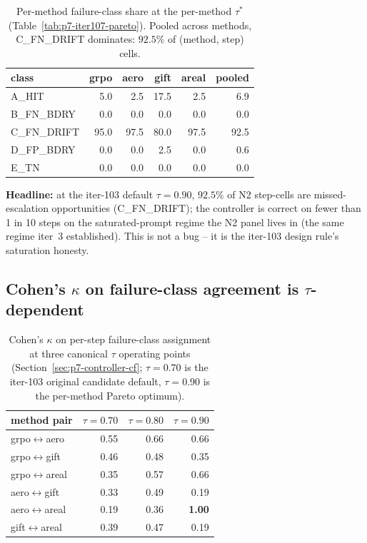 \begin{table}[t]
\centering\small
\caption{Per-method failure-class share at the per-method $\tau^*$ (Table~\ref{tab:p7-iter107-pareto}).  Pooled across methods,
C\_FN\_DRIFT dominates: $92.5\%$ of (method, step) cells.}
\label{tab:p7-iter107-failshare}
\vspace{2pt}
\begin{tabular}{lrrrrr}
\toprule
class & grpo & aero & gift & areal & pooled \\
\midrule
A\_HIT       &  5.0 &  2.5 & 17.5 &  2.5 &  6.9 \\
B\_FN\_BDRY  &  0.0 &  0.0 &  0.0 &  0.0 &  0.0 \\
C\_FN\_DRIFT & 95.0 & 97.5 & 80.0 & 97.5 & 92.5 \\
D\_FP\_BDRY  &  0.0 &  0.0 &  2.5 &  0.0 &  0.6 \\
E\_TN        &  0.0 &  0.0 &  0.0 &  0.0 &  0.0 \\
\bottomrule
\end{tabular}
\end{table}

\textbf{Headline:} at the iter-103 default $\tau{=}0.90$, $92.5\%$ of N2
step-cells are missed-escalation opportunities (C\_FN\_DRIFT); the
controller is correct on fewer than 1 in 10 steps on the saturated-prompt
regime the N2 panel lives in (the same regime iter~3 established).  This is
not a bug -- it is the iter-103 design rule's saturation honesty.

\subsection{Cohen's $\kappa$ on failure-class agreement is $\tau$-dependent}

\begin{table}[t]
\centering\small
\caption{Cohen's $\kappa$ on per-step failure-class assignment at three
canonical $\tau$ operating points (Section~\ref{sec:p7-controller-cf};
$\tau{=}0.70$ is the iter-103 original candidate default,
$\tau{=}0.90$ is the per-method Pareto optimum).}
\label{tab:p7-iter107-kappa}
\vspace{2pt}
\begin{tabular}{lrrr}
\toprule
method pair & $\tau{=}0.70$ & $\tau{=}0.80$ & $\tau{=}0.90$ \\
\midrule
grpo$\leftrightarrow$aero   &  0.55  &  0.66  &  0.66 \\
grpo$\leftrightarrow$gift   &  0.46  &  0.48  &  0.35 \\
grpo$\leftrightarrow$areal  &  0.35  &  0.57  &  0.66 \\
aero$\leftrightarrow$gift   &  0.33  &  0.49  &  0.19 \\
aero$\leftrightarrow$areal  &  0.19  &  0.36  &  \textbf{1.00} \\
gift$\leftrightarrow$areal  &  0.39  &  0.47  &  0.19 \\
\bottomrule
\end{tabular}
\end{table}

